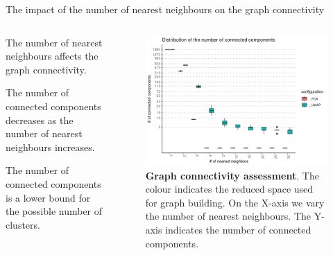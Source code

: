 \begin{frame}{The impact of the number of nearest neighbours on the graph connectivity}
    \begin{columns}
        \begin{column}{0.45\textwidth}
            \justifying

            The number of nearest neighbours affects the graph connectivity.
            \bigskip


            The number of connected components decreases as the number of nearest neighbours increases.
            \bigskip

            The number of connected components is a lower bound for the possible number of clusters.


        \end{column}

        \begin{column}{0.5\textwidth}
            \begin{figure}
                \centering
                \includegraphics[width=\textwidth]{images/ch3/3_conn_comp.png}
                \caption{\justifying \textbf{Graph connectivity assessment}. The colour indicates the reduced space used for graph building. On the X-axis we vary the number of nearest neighbours. The Y-axis indicates the number of connected components. }
            \end{figure}
        \end{column}
    \end{columns}
\end{frame}


